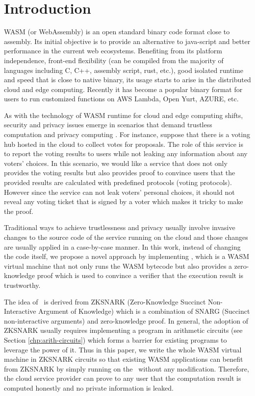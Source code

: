 \section{Introduction}
WASM (or WebAssembly) is an open standard binary code format close to assembly. Its initial objective is to provide an alternative to java-script and better performance in the current web ecosystems. Benefiting from its platform independence, front-end flexibility (can be compiled from the majority of languages including C, C++, assembly script, rust, etc.), good isolated runtime and speed that is close to native binary, its usage starts to arise in the distributed cloud and edge computing. Recently it has become a popular binary format for users to run customized functions on AWS Lambda, Open Yurt, AZURE, etc.

As with the technology of WASM runtime for cloud and edge computing shifts, security and privacy \cite{ pearson2009taking} issues emerge in scenarios that demand trustless \cite{wood2016trustless, chang2002trustless} computation and privacy computing \cite{xiao2012security,takabi2010security}. For instance, suppose that there is a voting hub hosted in the cloud to collect votes for proposals. The role of this service is to report the voting results to users while not leaking any information about any voters' choices. In this scenario, we would like a service that does not only provides the voting results but also provides proof to convince users that the provided results are calculated with predefined protocols (voting protocols). However since the service can not leak voters' personal choices, it should not reveal any voting ticket that is signed by a voter which makes it tricky to make the proof. 

Traditional ways to achieve trustlessness and privacy usually involve invasive changes to the source code of the service running on the cloud and those changes are usually applied in a case-by-case manner. In this work, instead of changing the code itself, we propose a novel approach by implementing \zkwasm, which is a WASM virtual machine that not only runs the WASM bytecode but also provides a zero-knowledge proof which is used to convince a verifier that the execution result is trustworthy.

The idea of \zkwasm\, is derived from ZKSNARK (Zero-Knowledge Succinct Non-Interactive Argument of Knowledge) which is a combination of SNARG (Succinct non-interactive arguments) and zero-knowledge proof. In general, the adoption of ZKSNARK usually requires implementing a program in arithmetic circuits (see Section \ref{chp:arith-circuits}) which forms a barrier for existing programs to leverage the power of it. Thus in this paper, we write the whole WASM virtual machine in ZKSNARK circuits so that existing WASM applications can benefit from ZKSNARK by simply running on the \zkwasm\, without any modification. Therefore, the cloud service provider can prove to any user that the computation result is computed honestly and no private information is leaked.

